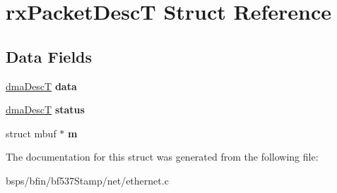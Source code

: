 \hypertarget{structrxPacketDescT}{}\section{rx\+Packet\+DescT Struct Reference}
\label{structrxPacketDescT}
\subsection*{Data Fields}
\begin{DoxyCompactItemize}
\item 
\mbox{\label{structrxPacketDescT_aa77a654e2ee9b6c639b4cde48806e7ac}} 
\mbox{\hyperlink{structdmaDescS}{dma\+DescT}} {\bfseries data}
\item 
\mbox{\label{structrxPacketDescT_a209611e93d3225629cd7ac3f68ae651f}} 
\mbox{\hyperlink{structdmaDescS}{dma\+DescT}} {\bfseries status}
\item 
\mbox{\label{structrxPacketDescT_a1c0f4a0c3d49ca05ac473a93b650edc8}} 
struct mbuf $\ast$ {\bfseries m}
\end{DoxyCompactItemize}


The documentation for this struct was generated from the following file\+:\begin{DoxyCompactItemize}
\item 
bsps/bfin/bf537\+Stamp/net/ethernet.\+c\end{DoxyCompactItemize}
